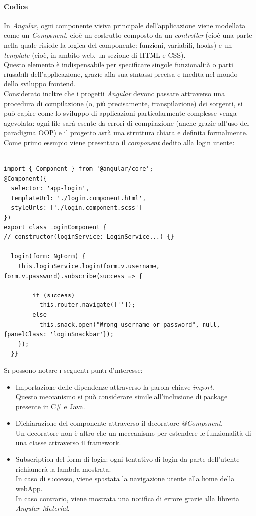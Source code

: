 \documentclass[12pt]{article}
\begin{document}
\paragraph{Codice}
In \textit{Angular}, ogni componente visiva principale dell'applicazione viene modellata come un \textit{Component}, cioè un costrutto composto da un \textit{controller} (cioè una parte nella quale risiede la logica del componente: funzioni, variabili, hooks) e un \textit{template} (cioè, in ambito web, un sezione di HTML e CSS).\\
Questo elemento è indispensabile per specificare singole funzionalità o parti riusabili dell'applicazione, grazie alla sua sintassi precisa e inedita nel mondo dello sviluppo frontend.\\
Considerato inoltre che i progetti \textit{Angular} devono passare attraverso una procedura di compilazione (o, più precisamente, transpilazione) dei sorgenti, si può capire come lo sviluppo di applicazioni particolarmente complesse venga agevolata: ogni file sarà esente da errori di compilazione (anche grazie all'uso del paradigma OOP) e il progetto avrà una struttura chiara e definita formalmente.
\newpage
Come primo esempio viene presentato il \textit{component} dedito alla login utente:
\begin{lstlisting}

import { Component } from '@angular/core';
@Component({
  selector: 'app-login',
  templateUrl: './login.component.html',
  styleUrls: ['./login.component.scss']
})
export class LoginComponent {
// constructor(loginService: LoginService...) {}

  login(form: NgForm) {
    this.loginService.login(form.v.username, form.v.password).subscribe(success => {     
     
        if (success) 
          this.router.navigate(['']);
        else
          this.snack.open("Wrong username or password", null, {panelClass: 'loginSnackbar'});
    });
  }}
\end{lstlisting}
\phantom{\\}
Si possono notare i seguenti punti d'interesse: 
\begin{itemize}
\item Importazione delle dipendenze attraverso la parola chiave \textit{import}.\\
Questo meccanismo si può considerare simile all'inclusione di package presente in C\# e Java.
\item Dichiarazione del componente attraverso il decoratore \textit{@Component}.\\ 
Un decoratore non è altro che un meccanismo per estendere le funzionalità di una classe attraverso il framework.
\item Subscription del form di login: ogni tentativo di login da parte dell'utente richiamerà la lambda mostrata.\\
In caso di successo, viene spostata la navigazione utente alla home della webApp.\\
In caso contrario, viene mostrata una notifica di errore grazie alla libreria \textit{Angular Material}.
\end{itemize}
\end{document}
